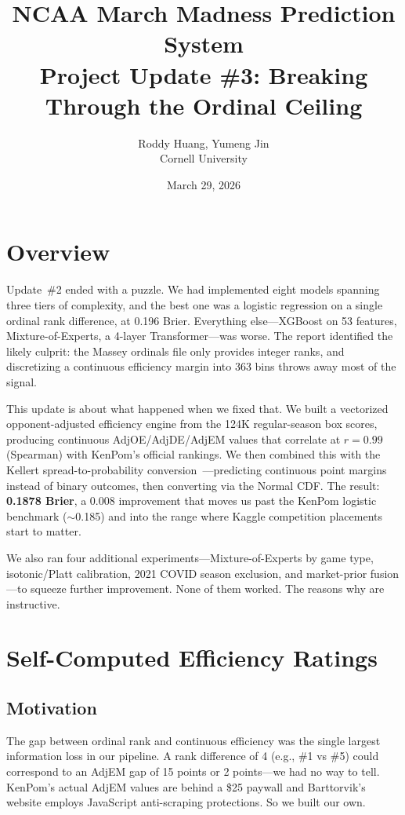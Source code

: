 \documentclass[11pt,a4paper]{article}
\title{%
    \vspace{-1cm}
    {\LARGE\bfseries NCAA March Madness Prediction System}\\[6pt]
    {\large Project Update \#3: Breaking Through the Ordinal Ceiling}
}
\author{
    Roddy Huang, Yumeng Jin \\
    Cornell University
}
\date{March 29, 2026}
\begin{document}
\maketitle
\thispagestyle{fancy}


\section{Overview}

Update~\#2 ended with a puzzle. We had implemented eight models spanning three tiers of complexity, and the best one was a logistic regression on a single ordinal rank difference, at 0.196 Brier. Everything else---XGBoost on 53 features, Mixture-of-Experts, a 4-layer Transformer---was worse. The report identified the likely culprit: the Massey ordinals file only provides integer ranks, and discretizing a continuous efficiency margin into 363 bins throws away most of the signal.

This update is about what happened when we fixed that. We built a vectorized opponent-adjusted efficiency engine from the 124K regular-season box scores, producing continuous AdjOE/AdjDE/AdjEM values that correlate at $r = 0.99$ (Spearman) with KenPom's official rankings. We then combined this with the Kellert spread-to-probability conversion~\citep{kellert2017}---predicting continuous point margins instead of binary outcomes, then converting via the Normal CDF. The result: \textbf{0.1878 Brier}, a 0.008 improvement that moves us past the KenPom logistic benchmark ($\sim$0.185) and into the range where Kaggle competition placements start to matter.

We also ran four additional experiments---Mixture-of-Experts by game type, isotonic/Platt calibration, 2021 COVID season exclusion, and market-prior fusion---to squeeze further improvement. None of them worked. The reasons why are instructive.


\section{Self-Computed Efficiency Ratings}

\subsection{Motivation}

The gap between ordinal rank and continuous efficiency was the single largest information loss in our pipeline. A rank difference of 4 (e.g., \#1 vs \#5) could correspond to an AdjEM gap of 15 points or 2 points---we had no way to tell. KenPom's actual AdjEM values are behind a \$25 paywall and Barttorvik's website employs JavaScript anti-scraping protections. So we built our own.
\end{document}
